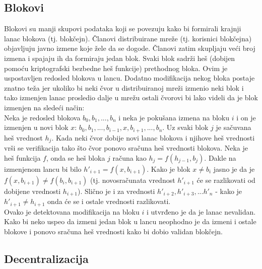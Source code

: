\documentclass[a4paper]{article}
\begin{document}
{\subsection{Blokovi}
Blokovi su manji skupovi podataka koji se povezuju kako bi formirali krajnji lanac blokova (tj. blokčejn).
Članovi distribuirane mreže (tj. korisnici blokčejna) objavljuju javno izmene koje žele da se dogode.
Članovi zatim skupljaju veći broj izmena i spajaju ih da formiraju jedan blok.
Svaki blok sadrži heš (dobijen pomoću kriptografski bezbedne heš funkcije) prethodnog bloka.
Ovim je uspostavljen redosled blokova u lancu. Dodatno modifikacija nekog bloka postaje znatno teža jer ukoliko
bi neki čvor u distribuiranoj mreži izmenio neki blok i tako izmenjen lanac prosledio dalje u mrežu
ostali čvorovi bi lako videli da je blok izmenjen na sledeći način:\\
Neka je redosled blokova $b_0,b_1,...,b_n$ i neka je pokušana izmena na bloku $i$ i on je izmenjen u novi blok $x$:
$b_0,b_1,...,b_{i-1},x,b_{i+1},...,b_n$.
Uz svaki blok $j$ je sačuvana heš vrednost $h_j$. Kada neki čvor dobije novi lanac blokova i njihove heš vrednosti vrši se verifikacija
tako što čvor ponovo sračuna heš vrednosti blokova. Neka je heš funkcija $f$, onda se heš bloka $j$ računa kao
$h_j = f(h_{j-1},b_j)$. Dakle na izmenjenom lancu bi bilo $h'_{i+1} = f(x,b_{i+1})$. Kako je blok $x \neq b_i$ jasno je
da je $f(x,b_{i+1}) \neq f(b_{i},b_{i+1})$ (tj. novosračunata vrednost $h'_{i+1}$ će se razlikovati od dobijene vrednosti $h_{i+1}$).
Slično je i za vrednosti $h'_{i+2},h'_{i+3},...h'_{n}$ - kako je $h'_{i+1} \neq h_{i+1}$ onda će se i ostale vrednosti razlikovati.\\
Ovako je detektovana modifikacija na bloku $i$ i utvrđeno je da je lanac nevalidan.
Kako bi neko uspeo da izmeni jedan blok u lancu neophodno je da izmeni i ostale blokove i ponovo sračuna
heš vrednosti kako bi dobio validan blokčejn. 

\subsection{Decentralizacija}

}
\end{document}
